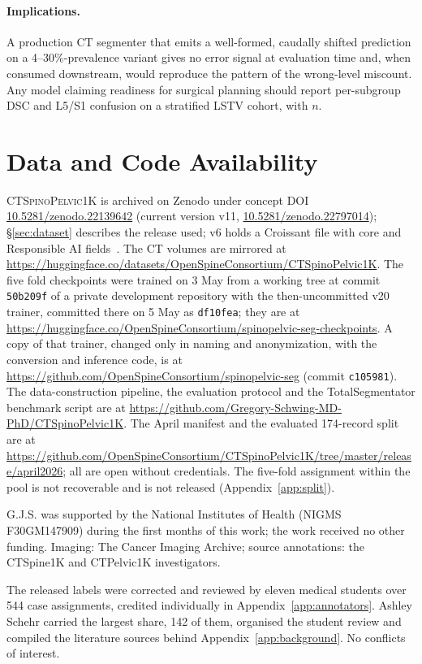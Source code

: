 \documentclass{article}
\newcommand{\dataset}{\textsc{CTSpinoPelvic1K}}
\newcommand{\TS}{TotalSegmentator}
\begin{document}
\paragraph{Implications.}
A production CT segmenter that emits a well-formed,
caudally shifted prediction on a 4--30\%-prevalence
variant gives no error signal at evaluation time and,
when consumed downstream, would reproduce the pattern of
the wrong-level miscount. Any model claiming readiness for
surgical planning should report per-subgroup DSC and
L5/S1 confusion on a stratified LSTV cohort, with $n$.

\section*{Data and Code Availability}

\dataset{} is archived on Zenodo under concept DOI
\href{https://doi.org/10.5281/zenodo.22139642}{10.5281/zenodo.22139642}
(current version v11,
\href{https://doi.org/10.5281/zenodo.22797014}{10.5281/zenodo.22797014});
\S\ref{sec:dataset} describes the release used; v6 holds
a Croissant file with core and Responsible AI
fields~\citep{Akhtar2024Croissant:Datasets}. The CT
volumes are mirrored at
\url{https://huggingface.co/datasets/OpenSpineConsortium/CTSpinoPelvic1K}.
The five fold checkpoints were trained on 3 May from a
working tree at commit \texttt{50b209f} of a private
development repository with the then-uncommitted v20
trainer, committed there on 5 May as \texttt{df10fea};
they are at
\url{https://huggingface.co/OpenSpineConsortium/spinopelvic-seg-checkpoints}.
A copy of that trainer, changed only
in naming and anonymization, with the conversion and
inference code, is at
\url{https://github.com/OpenSpineConsortium/spinopelvic-seg}
(commit \texttt{c105981}). The data-construction pipeline,
the evaluation protocol and the \TS{} benchmark script are at
\url{https://github.com/Gregory-Schwing-MD-PhD/CTSpinoPelvic1K}.
The April manifest and the evaluated 174-record split are
at
\url{https://github.com/OpenSpineConsortium/CTSpinoPelvic1K/tree/master/release/april2026};
all are open without credentials. The five-fold
assignment within the pool is not recoverable and is not
released (Appendix~\ref{app:split}).

\begin{ack}
G.J.S. was supported by the National Institutes of Health
(NIGMS F30GM147909) during the first months of this work;
the work received no other funding. Imaging: The Cancer
Imaging Archive; source annotations: the CTSpine1K and
CTPelvic1K investigators.

The released labels were corrected and reviewed by eleven
medical students over 544 case assignments, credited
individually in Appendix~\ref{app:annotators}. Ashley
Schehr carried the largest share, 142 of them, organised
the student review and compiled the literature sources
behind Appendix~\ref{app:background}. No conflicts of
interest.
\end{ack}
\end{document}
